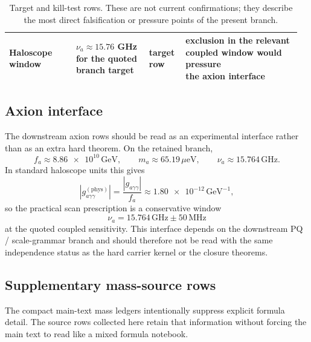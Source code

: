 \documentclass[11pt,a4paper]{article}
\theoremstyle{definition}
\theoremstyle{remark}
\begin{document}
\begin{table}[H]
{\begin{tabular}{@{}>{\raggedright\arraybackslash}p{0.22\linewidth}>{\raggedright\arraybackslash}p{0.24\linewidth}>{\raggedright\arraybackslash}p{0.12\linewidth}>{\raggedright\arraybackslash}p{0.38\linewidth}@{}}
Haloscope window & \makecell[l]{$\nu_a\approx\num{15.76}$ GHz\\for the quoted branch target} & \makecell[l]{target\\row} & \makecell[l]{exclusion in the relevant\\coupled window would pressure\\the axion interface} \\
\bottomrule
\end{tabular}}
\caption{Target and kill-test rows. These are not current confirmations; they describe the most direct falsification or pressure points of the present branch.}
\label{tab:kill-tests}
\end{table}

\subsection{Axion interface}

The downstream axion rows should be read as an experimental interface rather than as an extra hard theorem. On the retained branch,
\[
f_a\approx \num{8.86e10}\,\mathrm{GeV},
\qquad
m_a\approx \num{65.19}\,\mu\mathrm{eV},
\qquad
\nu_a\approx \num{15.764}\,\mathrm{GHz}.
\]
In standard haloscope units this gives
\[
\left|g_{a\gamma\gamma}^{(\mathrm{phys})}\right|
=
\frac{|g_{a\gamma\gamma}|}{f_a}
\approx
\num{1.80e-12}\,\mathrm{GeV}^{-1},
\]
so the practical scan prescription is a conservative window
\[
\nu_a=\num{15.764}\,\mathrm{GHz}\pm \num{50}\,\mathrm{MHz}
\]
at the quoted coupled sensitivity. This interface depends on the downstream PQ / scale-grammar branch and should therefore not be read with the same independence status as the hard carrier kernel or the closure theorems.

\subsection{Supplementary mass-source rows}

The compact main-text mass ledgers intentionally suppress explicit formula detail. The source rows collected here retain that information without forcing the main text to read like a mixed formula notebook.
\end{document}
